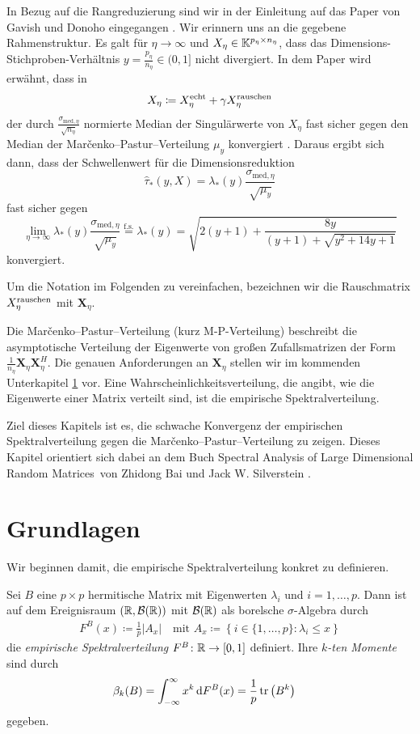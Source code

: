 \documentclass[../Bachelor_LennartKoliwer.tex]{subfiles}
\begin{document}
In Bezug auf die Rangreduzierung sind wir in der Einleitung auf das Paper von Gavish und Donoho eingegangen \cite{OHT}.
Wir erinnern uns an die gegebene Rahmenstruktur. Es galt für $\eta\to\infty$ und $X_\eta\in\mathbb{K}^{p_\eta\times n_\eta}$, dass das Dimensions-Stichproben-Verhältnis ${y=\frac{p_\eta}{n_\eta}\in (0,1]}$ nicht divergiert.
In dem Paper wird erwähnt, dass in 
\[
    X_\eta \coloneqq X^\text{echt}_\eta+\gamma X^\text{rauschen}_\eta
\] 
der durch $\frac{\sigma_{\text{med},\eta}}{\sqrt{n_\eta}}$ normierte Median der Singulärwerte von $X_\eta$ fast sicher gegen den Median der Mar\v{c}enko--Pastur--Verteilung $\mu_y$ konvergiert \cite[11]{OHT}.
Daraus ergibt sich dann, dass der Schwellenwert für die Dimensionsreduktion
\[
    \hat{\tau}_*(y,X) = \lambda_*(y)\frac{\sigma_{\text{med},\eta}}{\sqrt{\mu_y}}
\]
fast sicher gegen
\[
    \lim_{\eta\to\infty}\lambda_*(y)\frac{\sigma_{\text{med},\eta}}{\sqrt{\mu_y}} \overset{\text{f.s.}}{=} \lambda_*(y) = \sqrt{2(y+1)+\frac{8y}{(y+1)+\sqrt{y^2+14y+1}}}
\]
konvergiert.

Um die Notation im Folgenden zu vereinfachen, bezeichnen wir die Rauschmatrix $X^\text{rauschen}_\eta$ mit $\bm{X}_\eta$.

Die Mar\v{c}enko--Pastur--Verteilung (kurz M-P-Verteilung) beschreibt die asymptotische Verteilung der Eigenwerte von großen Zufallsmatrizen der Form $\frac{1}{n_\eta} \bm{X}_\eta\bm{X}_\eta^H$.
Die genauen Anforderungen an $\bm{X}_\eta$ stellen wir im kommenden Unterkapitel \ref{chap:Grundlagen} vor.
Eine Wahrscheinlichkeitsverteilung, die angibt, wie die Eigenwerte einer Matrix verteilt sind, ist die empirische Spektralverteilung.

Ziel dieses Kapitels ist es, die schwache Konvergenz der empirischen Spektralverteilung gegen die Mar\v{c}enko--Pastur--Verteilung zu zeigen. 
Dieses Kapitel orientiert sich dabei an dem Buch \glqq Spectral Analysis of Large Dimensional Random Matrices\grqq\ von Zhidong Bai und Jack W. Silverstein \cite{BaiSilverstein}.


\section{Grundlagen}\label{chap:Grundlagen}

Wir beginnen damit, die empirische Spektralverteilung konkret zu definieren.
\begin{definition}\cite[4, 10]{BaiSilverstein}\label{def:ESD}
    Sei $B$ eine ${p\times p}$ hermitische Matrix mit Eigenwerten $\lambda_i$ und $i=1,\dots,p$.
    Dann ist auf dem Ereignisraum $(\mathbb{R},\mathcal{B}(\mathbb{R}))$ mit $\mathcal{B}(\mathbb{R})$ als borelsche $\sigma$-Algebra durch
    \begin{align*}
        F^B(x) \coloneqq \frac1p|A_x| \quad \text{mit } A_x\coloneqq\left\{i\in \{1,\dots,p\} \colon \lambda_i \leq x\right\}
    \end{align*}
    die \emph{empirische Spektralverteilung} $F^B\colon\mathbb{R}\to[0,1]$ definiert. 
    Ihre \emph{$k$-ten Momente} sind durch
    \begin{align*}
    \beta_k(B)&= \int_{-\infty}^{\infty}x^k\diff F^{B}(x) = \frac{1}{p}\tr\lr{B^k}
\end{align*}
    gegeben.
\end{definition}
\end{document}

